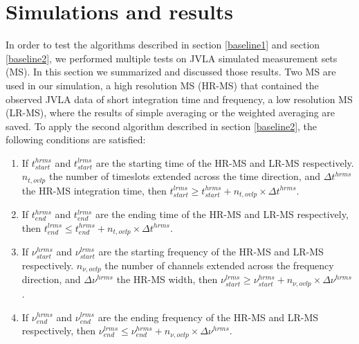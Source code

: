 \documentclass[useAMS,usenatbib]{mn2e}
\begin{document}
\section{Simulations and results}
In order to test the algorithms described in section \ref{baseline1} and section \ref{baseline2}, we performed  multiple tests on JVLA 
simulated measurement sets (MS). In 
this section we summarized and discussed those results. Two MS are used in 
our simulation, a high resolution MS (HR-MS) that contained the observed JVLA data of short integration time and frequency, a low resolution 
MS (LR-MS), where the results of simple averaging or the weighted averaging are saved. To apply the second algorithm described in 
section 
\ref{baseline2}, the following conditions are satisfied:
\begin{enumerate}
 \item If $t^{hrms}_{start}$ and $t^{lrms}_{start}$ are the starting time of the HR-MS and LR-MS respectively. $n_{t,ovlp}$ the number 
of timeslots extended across the time direction, and  $\Delta t^{hrms}$ the HR-MS integration time, then 
	    $t^{lrms}_{start}\geq t^{hrms}_{start} + n_{t,ovlp}\times \Delta t^{hrms}$. 
  \item If $t^{hrms}_{end}$ and $t^{lrms}_{end}$ are the ending time of the HR-MS and LR-MS respectively, then 
	    $t^{lrms}_{end}\leq t^{hrms}_{end} + n_{t,ovlp}\times \Delta t^{hrms}$. 
 \item If $\nu^{hrms}_{start}$ and $\nu^{lrms}_{start}$ are the starting frequency of the HR-MS and LR-MS respectively. $n_{\nu,ovlp}$ 
the number of channels extended across the frequency direction, and  $\Delta \nu^{hrms}$ the HR-MS width, then 
	    $\nu^{lrms}_{start} \geq \nu^{hrms}_{start} + n_{\nu,ovlp}\times \Delta \nu^{hrms}$. 
 \item If $\nu^{hrms}_{end}$ and $\nu^{lrms}_{end}$ are the ending frequency of the HR-MS and LR-MS respectively, then 
	    $\nu^{lrms}_{end} \leq \nu^{hrms}_{end} + n_{\nu,ovlp}\times \Delta \nu^{hrms}$. 
\end{enumerate}
\end{document}
